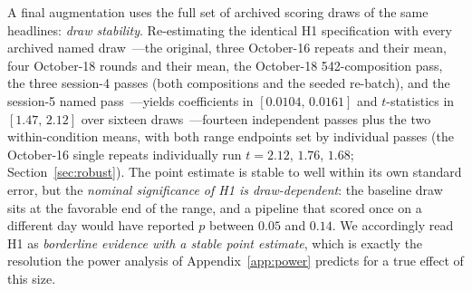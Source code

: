 A final augmentation uses the full set of archived scoring draws of the same headlines: \emph{draw stability}. Re-estimating the identical H1 specification with every archived named draw~---the original, three October-16 repeats and their mean, four October-18 rounds and their mean, the October-18 542-composition pass, the three session-4 passes (both compositions and the seeded re-batch), and the session-5 named pass~---yields coefficients in $[0.0104,\,0.0161]$ and $t$-statistics in $[1.47,\,2.12]$ over sixteen draws~---fourteen independent passes plus the two within-condition means, with both range endpoints set by individual passes (the October-16 single repeats individually run $t=2.12$, $1.76$, $1.68$; Section~\ref{sec:robust}). The point estimate is stable to well within its own standard error, but the \emph{nominal significance of H1 is draw-dependent}: the baseline draw sits at the favorable end of the range, and a pipeline that scored once on a different day would have reported $p$ between $0.05$ and $0.14$. We accordingly read H1 as \emph{borderline evidence with a stable point estimate}, which is exactly the resolution the power analysis of Appendix~\ref{app:power} predicts for a true effect of this size.

